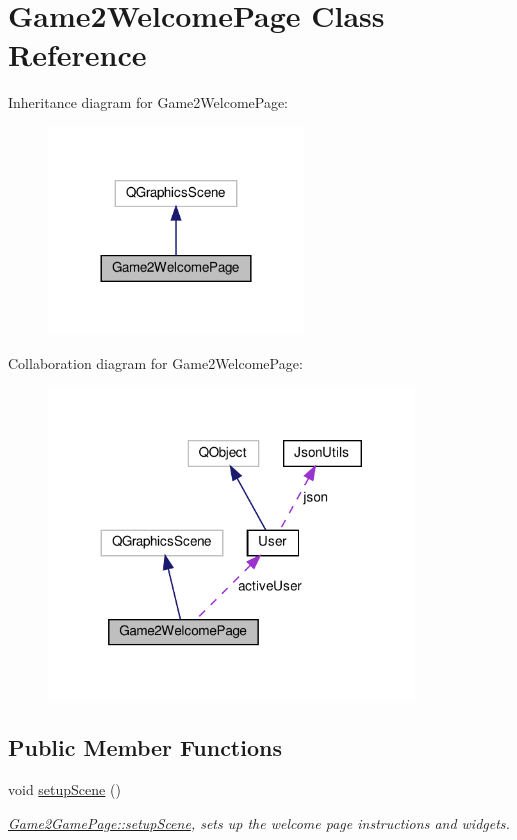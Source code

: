 \hypertarget{classGame2WelcomePage}{}\section{Game2\+Welcome\+Page Class Reference}
\label{classGame2WelcomePage}


Inheritance diagram for Game2\+Welcome\+Page\+:
\nopagebreak
\begin{figure}[H]
\begin{center}
\leavevmode
\includegraphics[width=192pt]{classGame2WelcomePage__inherit__graph}
\end{center}
\end{figure}


Collaboration diagram for Game2\+Welcome\+Page\+:
\nopagebreak
\begin{figure}[H]
\begin{center}
\leavevmode
\includegraphics[width=275pt]{classGame2WelcomePage__coll__graph}
\end{center}
\end{figure}
\subsection*{Public Member Functions}
\begin{DoxyCompactItemize}
\item 
\mbox{\label{classGame2WelcomePage_a25b5f78d9d26d51297edb5d897639ffd}} 
void \hyperlink{classGame2WelcomePage_a25b5f78d9d26d51297edb5d897639ffd}{setup\+Scene} ()
\begin{DoxyCompactList}\small\item\em \hyperlink{classGame2GamePage_ab71efdf6cb71c97b5a2238949f0c95b7}{Game2\+Game\+Page\+::setup\+Scene}, sets up the welcome page instructions and widgets. \end{DoxyCompactList}\end{DoxyCompactItemize}
